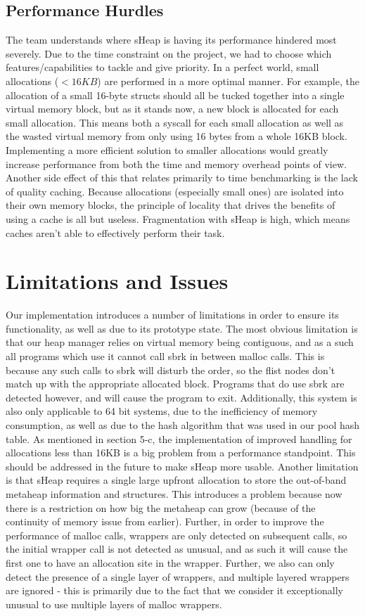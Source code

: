 \documentclass[conference]{IEEEtran}
\begin{document}
\subsection{Performance Hurdles}
The team understands where sHeap is having its performance hindered most severely. Due to 
the time constraint on the project, we had to choose which features/capabilities to tackle 
and give priority. In a perfect world, small allocations ($<16KB$) are performed in a more 
optimal manner. For example, the allocation of a small 16-byte structs should all be tucked 
together into a single virtual memory block, but as it stands now, a new block is allocated 
for each small allocation. This means both a syscall for each small allocation as well as 
the wasted virtual memory from only using 16 bytes from a whole 16KB block. Implementing a 
more efficient solution to smaller allocations would greatly increase performance from both 
the time and memory overhead points of view. Another side effect of this that relates 
primarily to time benchmarking is the lack of quality caching. Because allocations (especially 
small ones) are isolated into their own memory blocks, the principle of locality that drives 
the benefits of using a cache is all but useless. Fragmentation with sHeap is high, which means 
caches aren’t able to effectively perform their task.

\section{Limitations and Issues}
Our implementation introduces a number of limitations in order to ensure its functionality, as 
well as due to its prototype state. The most obvious limitation is that our heap manager 
relies on virtual memory being contiguous, and as a such all programs which use it cannot call 
sbrk in between malloc calls. This is because any such calls to sbrk will disturb the order, 
so the flist nodes don’t match up with the appropriate allocated block. Programs that do use 
sbrk are detected however, and will cause the program to exit. Additionally, this system is 
also only applicable to 64 bit systems, due to the inefficiency of memory consumption, as well 
as due to the hash algorithm that was used in our pool hash table. As mentioned in section 5-c, 
the implementation of improved handling for allocations less than 16KB is a big problem from a 
performance standpoint. This should be addressed in the future to make sHeap more usable. 
Another limitation is that sHeap requires a single large upfront allocation to store the 
out-of-band metaheap information and structures. This introduces a problem because now there is 
a restriction on how big the metaheap can grow (because of the continuity of memory issue from 
earlier). Further, in order to improve the performance of malloc calls, wrappers are only 
detected on subsequent calls, so the initial wrapper call is not detected as unusual, and as 
such it will cause the first one to have an allocation site in the wrapper. Further, we also 
can only detect the presence of a single layer of wrappers, and multiple layered wrappers are 
ignored - this is primarily due to the fact that we consider it exceptionally unusual to use 
multiple layers of malloc wrappers.
\end{document}
